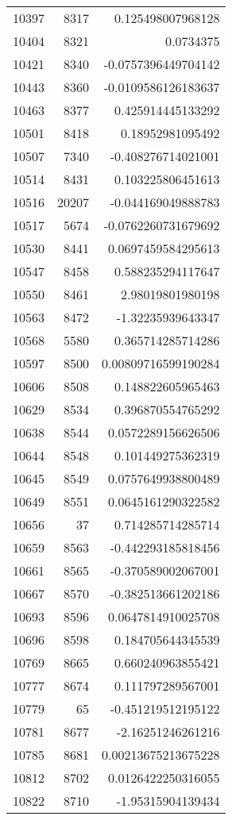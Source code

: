 \begin{tabular}{r | r | r}
10397 & 8317 & 0.125498007968128 \\
10404 & 8321 & 0.0734375 \\
10421 & 8340 & -0.0757396449704142 \\
10443 & 8360 & -0.0109586126183637 \\
10463 & 8377 & 0.425914445133292 \\
10501 & 8418 & 0.18952981095492 \\
10507 & 7340 & -0.408276714021001 \\
10514 & 8431 & 0.103225806451613 \\
10516 & 20207 & -0.044169049888783 \\
10517 & 5674 & -0.0762260731679692 \\
10530 & 8441 & 0.0697459584295613 \\
10547 & 8458 & 0.588235294117647 \\
10550 & 8461 & 2.98019801980198 \\
10563 & 8472 & -1.32235939643347 \\
10568 & 5580 & 0.365714285714286 \\
10597 & 8500 & 0.00809716599190284 \\
10606 & 8508 & 0.148822605965463 \\
10629 & 8534 & 0.396870554765292 \\
10638 & 8544 & 0.0572289156626506 \\
10644 & 8548 & 0.101449275362319 \\
10645 & 8549 & 0.0757649938800489 \\
10649 & 8551 & 0.0645161290322582 \\
10656 & 37 & 0.714285714285714 \\
10659 & 8563 & -0.442293185818456 \\
10661 & 8565 & -0.370589002067001 \\
10667 & 8570 & -0.382513661202186 \\
10693 & 8596 & 0.0647814910025708 \\
10696 & 8598 & 0.184705644345539 \\
10769 & 8665 & 0.660240963855421 \\
10777 & 8674 & 0.111797289567001 \\
10779 & 65 & -0.451219512195122 \\
10781 & 8677 & -2.16251246261216 \\
10785 & 8681 & 0.00213675213675228 \\
10812 & 8702 & 0.0126422250316055 \\
10822 & 8710 & -1.95315904139434 \\

\end{tabular}

